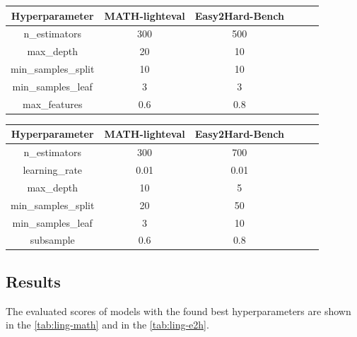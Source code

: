 \documentclass[runningheads]{llncs}
\begin{document}
\vspace{5pt}

\begin{minipage}{\linewidth}
    \centering
    \label{tab:rf-hyperparams}
    \begin{tabular}{@{}|Sc|Sc|Sc|@{}}
        \hline
        \textbf{Hyperparameter} & \textbf{MATH-lighteval} & \textbf{Easy2Hard-Bench} \\
        \hline
        n\_estimators & 300 & 500 \\
        max\_depth & 20 & 10 \\
        min\_samples\_split & 10 & 10 \\
        min\_samples\_leaf & 3 & 3 \\
        max\_features & 0.6 & 0.8 \\
        \hline
    \end{tabular}
\end{minipage}

\vspace{10pt}

\begin{minipage}{\linewidth}
    \centering
    \label{tab:gbr-hyperparams}
    \begin{tabular}{@{}|Sc|Sc|Sc|@{}}
        \hline
        \textbf{Hyperparameter} & \textbf{MATH-lighteval} & \textbf{Easy2Hard-Bench} \\
        \hline
        n\_estimators & 300 & 700 \\
        learning\_rate & 0.01 & 0.01 \\
        max\_depth & 10 & 5 \\
        min\_samples\_split & 20 & 50 \\
        min\_samples\_leaf & 3 & 10 \\
        subsample & 0.6 & 0.8 \\
        \hline
    \end{tabular}
\end{minipage}

\vspace{5pt}

\subsection{Results}

The evaluated scores of models with the found best hyperparameters are shown in the \cref{tab:ling-math} and in the \cref{tab:ling-e2h}.
\end{document}
